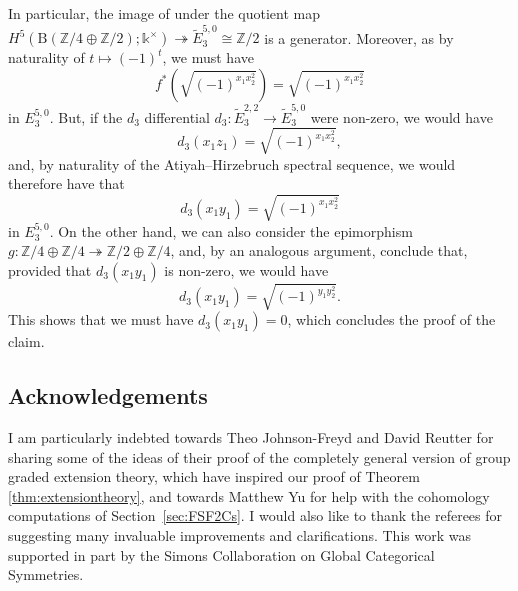 \documentclass[10pt,a4paper]{amsart}
\numberwithin{equation}{section}
\begin{document}
 In particular, the image of  under the quotient map $H^5(\mathrm{B}(\mathbb{Z}/4\oplus\mathbb{Z}/2);\mathds{k}^{\times})\twoheadrightarrow \widetilde{E}^{5,0}_3\cong \mathbb{Z}/2$ is a generator. Moreover, as  by naturality of $t\mapsto (-1)^t$, we must have
 \[
 f^*(\sqrt{(-1)^{x_1x_2^2}}) = \sqrt{(-1)^{x_1x_2^2}}
 \]
 in $E^{5,0}_3$. But, if the $d_3$ differential $d_3\colon\widetilde{E}^{2,2}_3\rightarrow \widetilde{E}^{5,0}_3$ were non-zero, we would have
 \[d_3(x_1z_1) = \sqrt{(-1)^{x_1x_2^2}},
 \]
 and, by naturality of the Atiyah--Hirzebruch spectral sequence, we would therefore have that
 \[
 d_3(x_1y_1) = \sqrt{(-1)^{x_1x_2^2}}
 \]
in $E^{5,0}_3$. On the other hand, we can also consider the epimorphism $g\colon\mathbb{Z}/4\oplus\mathbb{Z}/4\twoheadrightarrow \mathbb{Z}/2\oplus\mathbb{Z}/4$, and, by an analogous argument, conclude that, provided that $d_3(x_1y_1)$ is non-zero, we would have \[d_3(x_1y_1)=\sqrt{(-1)^{y_1y_2^2}}.\] This shows that we must have $d_3(x_1y_1) = 0$, which concludes the proof of the claim.

\subsection*{Acknowledgements}

I am particularly indebted towards Theo Johnson-Freyd and David Reutter for sharing some of the ideas of their proof of the completely general version of group graded extension theory, which have inspired our proof of Theorem \ref{thm:extensiontheory}, and towards Matthew Yu for help with the cohomology computations of Section~\ref{sec:FSF2Cs}. I would also like to thank the referees for suggesting many invaluable improvements and clarifications. This work was supported in part by the Simons Collaboration on Global Categorical Symmetries.

\end{document}
